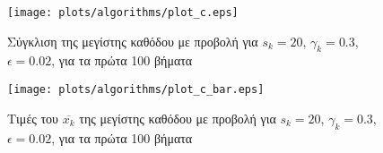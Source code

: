 \begin{figure}[htbp]
	\centerfloat
	\texttt{[image: plots/algorithms/plot\_c.eps]}
	\caption{Σύγκλιση της μεγίστης καθόδου με προβολή για $s_k = 20$, $\gamma_k = 0.3$, $\epsilon = 0.02$, για τα πρώτα 100 βήματα}
\end{figure}
\begin{figure}[htbp]
	\centerfloat
	\texttt{[image: plots/algorithms/plot\_c\_bar.eps]}
	\caption{Τιμές του $\overbar{x_k}$ της μεγίστης καθόδου με προβολή για $s_k = 20$, $\gamma_k = 0.3$, $\epsilon = 0.02$, για τα πρώτα 100 βήματα}
	\label{fig:c_xbar}
\end{figure}